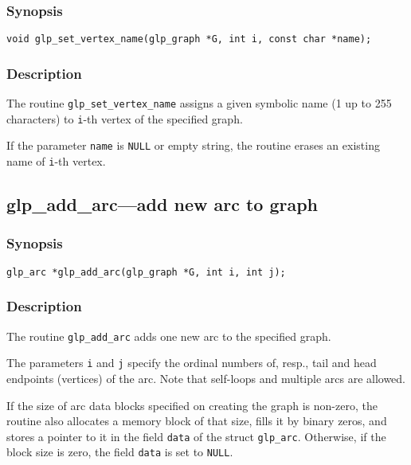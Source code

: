 \subsubsection*{Synopsis}

\begin{verbatim}
void glp_set_vertex_name(glp_graph *G, int i, const char *name);
\end{verbatim}

\subsubsection*{Description}

The routine \verb|glp_set_vertex_name| assigns a given symbolic name
(1 up to 255 characters) to \verb|i|-th vertex of the specified graph.

If the parameter \verb|name| is \verb|NULL| or empty string, the
routine erases an existing name of \verb|i|-th vertex.

\newpage

\subsection{glp\_add\_arc---add new arc to graph}

\subsubsection*{Synopsis}

\begin{verbatim}
glp_arc *glp_add_arc(glp_graph *G, int i, int j);
\end{verbatim}

\subsubsection*{Description}

The routine \verb|glp_add_arc| adds one new arc to the specified graph.

The parameters \verb|i| and \verb|j| specify the ordinal numbers of,
resp., tail and head endpoints (vertices) of the arc. Note that
self-loops and multiple arcs are allowed.

If the size of arc data blocks specified on creating the graph is
non-zero, the routine also allocates a memory block of that size, fills
it by binary zeros, and stores a pointer to it in the field \verb|data|
of the struct \verb|glp_arc|. Otherwise, if the block size is zero, the
field \verb|data| is set to \verb|NULL|.

